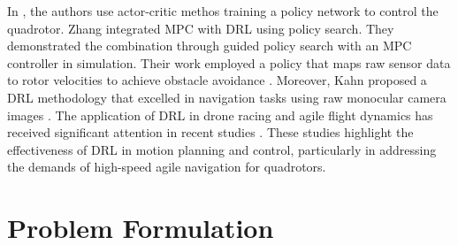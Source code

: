 \documentclass[letterpaper,journal,twoside]{IEEEtran}
\begin{document}
In \cite{hwangbo2017control}, the authors use actor-critic 
methos training a policy network to control the quadrotor. 
Zhang \etal integrated MPC with DRL using policy search. 
They demonstrated the combination through guided policy search 
with an MPC controller in simulation. 
Their work employed a policy that maps raw sensor data to rotor 
velocities to achieve obstacle avoidance \cite{zhang2016learning}. 
Moreover, Kahn \etal proposed a DRL methodology that excelled in 
navigation tasks using raw monocular camera images \cite{kahn2018self}.
The application of DRL in drone racing and agile flight dynamics 
has received significant attention in recent studies \cite{loquercio2019deep, song2021autonomous, song2022policy, penicka2022learning, song2023reaching}. 
These studies highlight the effectiveness of DRL in motion 
planning and control, particularly in addressing the demands of 
high-speed agile navigation for quadrotors.


\section{Problem Formulation}
\end{document}
